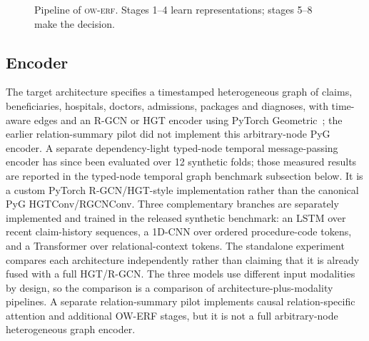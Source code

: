 \documentclass[conference]{IEEEtran}
\newcommand{\ERF}{\textsc{ow-erf}}
\begin{document}
\begin{figure}[t]
\centering
{}
\caption{Pipeline of \ERF{}. Stages 1--4 learn representations; stages 5--8 make the decision.}
\label{fig:arch}
\end{figure}

\subsection{Encoder}
The target architecture specifies a timestamped heterogeneous graph of claims, beneficiaries, hospitals, doctors, admissions, packages and diagnoses, with time-aware edges and an R-GCN or HGT encoder using PyTorch Geometric~\cite{fey2019pyg,schlichtkrull2018,hu2020hgt}; the earlier relation-summary pilot did not implement this arbitrary-node PyG encoder. A separate dependency-light typed-node temporal message-passing encoder has since been evaluated over 12 synthetic folds; those measured results are reported in the typed-node temporal graph benchmark subsection below. It is a custom PyTorch R-GCN/HGT-style implementation rather than the canonical PyG HGTConv/RGCNConv. Three complementary branches are separately implemented and trained in the released synthetic benchmark: an LSTM over recent claim-history sequences, a 1D-CNN over ordered procedure-code tokens, and a Transformer over relational-context tokens. The standalone experiment compares each architecture independently rather than claiming that it is already fused with a full HGT/R-GCN. The three models use different input modalities by design, so the comparison is a comparison of architecture-plus-modality pipelines. A separate relation-summary pilot implements causal relation-specific attention and additional OW-ERF stages, but it is not a full arbitrary-node heterogeneous graph encoder.
\end{document}
